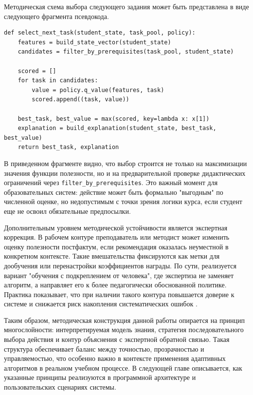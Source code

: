 Методическая схема выбора следующего задания может быть представлена в виде
следующего фрагмента псевдокода.

\begin{lstlisting}[style=sthgcode-python,caption={Псевдокод шага адаптивного выбора задания}]
def select_next_task(student_state, task_pool, policy):
    features = build_state_vector(student_state)
    candidates = filter_by_prerequisites(task_pool, student_state)

    scored = []
    for task in candidates:
        value = policy.q_value(features, task)
        scored.append((task, value))

    best_task, best_value = max(scored, key=lambda x: x[1])
    explanation = build_explanation(student_state, best_task, best_value)
    return best_task, explanation
\end{lstlisting}

В приведенном фрагменте видно, что выбор строится не только на максимизации
значения функции полезности, но и на предварительной проверке дидактических
ограничений через \texttt{filter\_by\_prerequisites}. Это важный момент для
образовательных систем: действие может быть формально "выгодным" по численной
оценке, но недопустимым с точки зрения логики курса, если студент еще не освоил
обязательные предпосылки.

Дополнительным уровнем методической устойчивости является экспертная коррекция.
В рабочем контуре преподаватель или методист может изменить оценку полезности
постфактум, если рекомендация оказалась неуместной в конкретном контексте.
Такие вмешательства фиксируются как метки для дообучения или перенастройки
коэффициентов награды. По сути, реализуется вариант "обучения с подкреплением
от человека", где экспертиза не заменяет алгоритм, а направляет его к более
педагогически обоснованной политике. Практика показывает, что при наличии
такого контура повышается доверие к системе и снижается риск накопления
систематических ошибок \autocite{said2024,subramanian2020}.

Таким образом, методическая конструкция данной работы опирается на принцип
многослойности: интерпретируемая модель знания, стратегия последовательного
выбора действия и контур объяснения с экспертной обратной связью. Такая
структура обеспечивает баланс между точностью, прозрачностью и управляемостью,
что особенно важно в контексте применения адаптивных алгоритмов в реальном
учебном процессе. В следующей главе описывается, как указанные принципы
реализуются в программной архитектуре и пользовательских сценариях системы.
